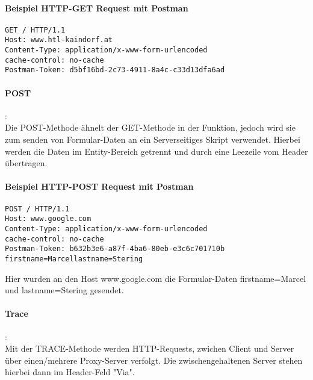 {\paragraph{Beispiel HTTP-GET Request mit Postman}
\begin{lstlisting}
GET / HTTP/1.1
Host: www.htl-kaindorf.at
Content-Type: application/x-www-form-urlencoded
cache-control: no-cache
Postman-Token: d5bf16bd-2c73-4911-8a4c-c33d13dfa6ad
\end{lstlisting}
\paragraph{POST}:\\Die POST-Methode ähnelt der GET-Methode in der Funktion, jedoch wird sie zum senden von Formular-Daten an ein Serverseitiges Skript verwendet. Hierbei werden die Daten im Entity-Bereich getrennt und durch eine Leezeile vom Header übertragen.
\paragraph{Beispiel HTTP-POST Request mit Postman}
\begin{lstlisting}
POST / HTTP/1.1
Host: www.google.com
Content-Type: application/x-www-form-urlencoded
cache-control: no-cache
Postman-Token: b632b3e6-a87f-4ba6-80eb-e3c6c701710b
firstname=Marcellastname=Stering
\end{lstlisting}
Hier wurden an den Host www.google.com die Formular-Daten firstname=Marcel und lastname=Stering gesendet.
\paragraph{Trace}:\\Mit der TRACE-Methode werden HTTP-Requests, zwichen Client und Server über einen/mehrere Proxy-Server verfolgt. Die zwischengehaltenen Server stehen hierbei dann im Header-Feld "Via".
}
